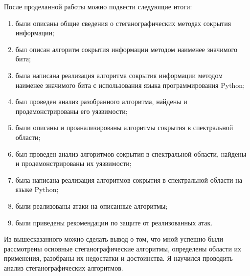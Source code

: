 \Conclusion
После проделанной работы можно подвести следующие итоги:
\begin{enumerate}
    \item были описаны общие сведения о стеганографических методах сокрытия информации;
    \item был описан алгоритм сокрытия информации методом наименее значимого бита;
    \item была написана реализация алгоритма сокрытия информации методом наименее
    значимого бита с использования языка программирования Python;
    \item был проведен анализ разобранного алгоритма, найдены и продемонстрированы
    его уязвимости;
    \item были описаны и проанализированы алгоритмы сокрытия в спектральной области;
    \item был проведен анализ алгоритмов сокрытия в спектральной области,
    найдены и продемонстрированы их уязвимости;
    \item была написана реализация алгоритмов сокрытия в спектральной области на языке Python;
    \item были реализованы атаки на описанные алгоритмы;
    \item были приведены рекомендации по защите от реализованных атак.
\end{enumerate}

Из вышесказанного можно сделать вывод о том, что мной успешно были
рассмотрены основные стеганографические алгоритмы, определены области их применения,
разобраны их недостатки и достоинства. Я научился проводить анализ стеганографических алгоритмов.